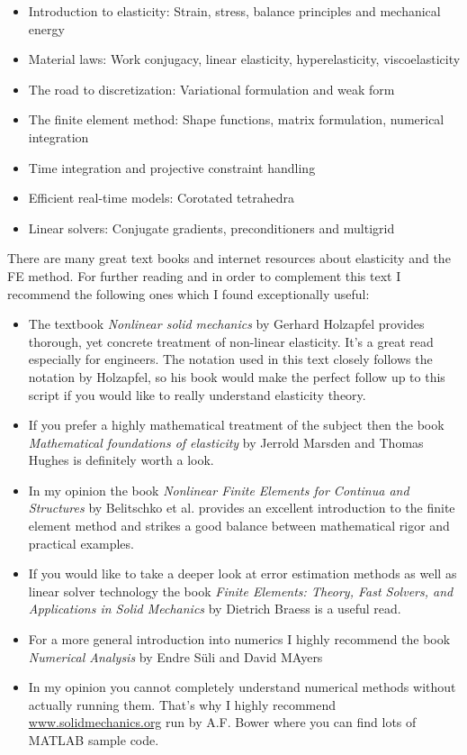 \begin{itemize}

		\item Introduction to elasticity: Strain, stress, balance principles and mechanical energy
		\item Material laws: Work conjugacy, linear elasticity, hyperelasticity, viscoelasticity
		\item The road to discretization: Variational formulation and weak form
		\item The finite element method: Shape functions, matrix formulation, numerical integration
		\item Time integration and projective constraint handling
		\item Efficient real-time models: Corotated tetrahedra
		\item Linear solvers: Conjugate gradients, preconditioners and multigrid
			
\end{itemize}

There are many great text books and internet resources about elasticity and the FE method. For further reading and in order to complement this text I recommend the following ones which I found exceptionally useful:

\begin{itemize}

		\item The textbook \emph{Nonlinear solid mechanics} by Gerhard Holzapfel provides thorough, yet concrete treatment of non-linear elasticity. It's a great read especially for engineers. The notation used in this text closely follows the notation by Holzapfel, so his book would make the perfect follow up to this script if you would like to really understand elasticity theory.
			\item If you prefer a highly mathematical treatment of the subject then the book \emph{Mathematical foundations of elasticity} by Jerrold Marsden and Thomas Hughes is definitely worth a look.
			\item In my opinion the book \emph{Nonlinear Finite Elements for Continua and Structures} by Belitschko et al. provides an excellent introduction to the finite element method and strikes a good balance between mathematical rigor and practical examples.
			\item If you would like to take a deeper look at error estimation methods as well as linear solver technology the book \emph{Finite Elements: Theory, Fast Solvers, and Applications in Solid Mechanics} by Dietrich Braess is a useful read.
			\item For a more general introduction into numerics I highly recommend the book \emph{Numerical Analysis} by Endre S\"uli and David MAyers
			\item In my opinion you cannot completely understand numerical methods without actually running them. That's why I highly recommend \url{www.solidmechanics.org} run by A.F. Bower where you can find lots of MATLAB sample code. 			
			
\end{itemize}

